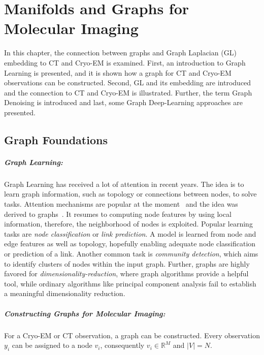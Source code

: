 \chapter{Manifolds and Graphs for Molecular Imaging}
\label{sec:manifold_and_graphs}
    
In this chapter, the connection between graphs and Graph Laplacian (GL) embedding to 
CT and Cryo-EM is examined. 
First, an introduction to Graph Learning is presented, and it is shown how a graph
for CT and Cryo-EM observations can be constructed.
Second, GL and its embedding are introduced and the connection to CT and Cryo-EM is illustrated.
Further, the term Graph Denoising is introduced and last, some Graph Deep-Learning approaches are presented.


\section{Graph Foundations}

\paragraph{Graph Learning:} 
Graph Learning has received a lot of attention in recent years.
The idea is to learn graph information, such as topology or connections between nodes, to solve tasks.
Attention mechanisms are popular at the moment~\cite{transformer} and the idea was derived to graphs~\cite{GAT}.
It resumes to computing node features by using local information, therefore, the neighborhood of nodes is exploited.
Popular learning tasks are \textit{node classification} or \textit{link prediction}. 
A model is learned from node and edge features as well as topology, hopefully enabling adequate node classification
or prediction of a link.
Another common task is \textit{community detection}, which aims to identify clusters of nodes within the input graph.
Further, graphs are highly favored for \textit{dimensionality-reduction}, where 
graph algorithms provide a helpful tool, while ordinary algorithms like principal component analysis fail to 
establish a meaningful dimensionality reduction.


\paragraph{Constructing Graphs for Molecular Imaging:}
For a Cryo-EM or CT observation, a graph can be constructed.
Every observation $y_i$ can be assigned to a node $v_i$, consequently $v_i \in \mathbb{R}^M$ and $|V|=N$.

